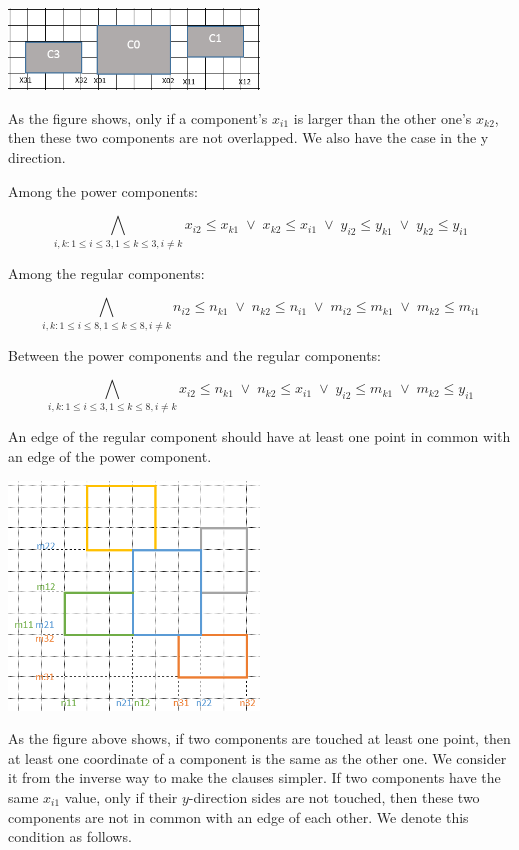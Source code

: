 \documentclass[11pt]{article}
\begin{document}
{\begin{description}
\begin{center}
\includegraphics[width=0.5\textwidth]{Part1_2_1.png}
\end{center}
  As the figure shows, only if a component's $x_{i1}$ is larger than the other one's $x_{k2}$, then these two components are not overlapped. We also have the case in the y direction.

  Among the power components:

  \[  \bigwedge_{i,k: 1 \leq i \leq 3, 1 \leq k \leq 3, i \neq k}
  x_{i2} \leq x_{k1} \; \vee \; x_{k2} \leq x_{i1} \; \vee \; y_{i2} \leq y_{k1} \; \vee \; y_{k2} \leq y_{i1} \]

  Among the regular components:

  \[  \bigwedge_{i,k: 1 \leq i \leq 8, 1 \leq k \leq 8, i \neq k}
  n_{i2} \leq n_{k1} \; \vee \; n_{k2} \leq n_{i1} \; \vee \; m_{i2} \leq m_{k1} \; \vee \; m_{k2} \leq m_{i1}  \]

  Between the power components and the regular components:

  \[  \bigwedge_{i,k: 1 \leq i \leq 3, 1 \leq k \leq 8, i \neq k}
   x_{i2} \leq n_{k1} \; \vee \; n_{k2} \leq x_{i1} \; \vee \; y_{i2} \leq m_{k1} \; \vee \; m_{k2} \leq y_{i1} \]

  \item[Constraint 4:] An edge of the regular component should have at least one point in common with an edge of the power component.

\begin{center}
\includegraphics[width=0.5\textwidth]{Part1_2_2.png}
\end{center}

  As the figure above shows, if two components are touched at least one point, then at least one coordinate of a component is the same as the other one. We consider it from the inverse way to make the clauses simpler. If two components have the same $x_{i1}$ value, only if their $y$-direction sides are not touched, then these two components are not in common with an edge of each other.
  We denote this condition as follows.


\end{description}}
\end{document}
